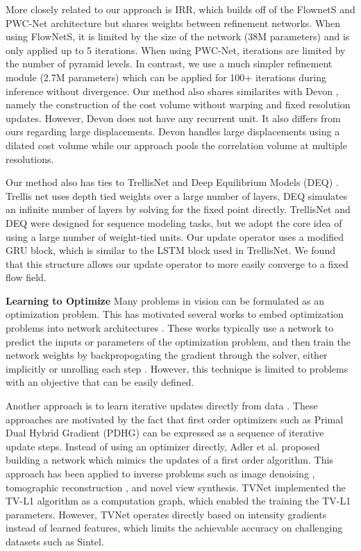\documentclass[runningheads]{llncs}
\begin{document}
More closely related to our approach is IRR\cite{irr}, which builds off of the FlownetS and PWC-Net architecture but shares weights between refinement networks.  When using FlowNetS, it is limited by the size of the network (38M parameters) and is only applied up to 5 iterations. When using PWC-Net, iterations are limited by the number of pyramid levels. In contrast, we use a much simpler refinement module (2.7M parameters) which can be applied for 100+ iterations during inference without divergence. Our method also shares similarites with Devon \cite{devon}, namely the construction of the cost volume without warping and fixed resolution updates. However, Devon does not have any recurrent unit. It also differs from ours regarding large displacements. Devon handles large displacements using a dilated cost volume while our approach pools the correlation volume at multiple resolutions.

Our method also has ties to TrellisNet \cite{trellis} and Deep Equilibrium Models (DEQ) \cite{deq}. Trellis net uses depth tied weights over a large number of layers, DEQ simulates an infinite number of layers by solving for the fixed point directly. TrellisNet and DEQ were designed for sequence modeling tasks, but we adopt the core idea of using a large number of weight-tied units. Our update operator uses a modified GRU block\cite{cho2014properties}, which is similar to the LSTM block used in TrellisNet. We found that this structure allows our update operator to more easily converge to a fixed flow field.

\smallskip\noindent\textbf{Learning to Optimize}
Many problems in vision can be formulated as an optimization problem. This has motivated several works to embed optimization problems into network architectures \cite{optnet,diffcvx,banet,invcomp,deepv2d}. These works typically use a network to predict the inputs or parameters of the optimization problem, and then train the network weights by backpropogating the gradient through the solver, either implicitly\cite{optnet,diffcvx} or unrolling each step \cite{invcomp,banet}. However, this technique is limited to problems with an objective that can be easily defined.

Another approach is to learn iterative updates directly from data \cite{adler2017solving,adler2018learned}. These approaches are motivated by the fact that first order optimizers such as Primal Dual Hybrid Gradient (PDHG)\cite{pdhg} can be expressed as a sequence of iterative update steps. Instead of using an optimizer directly, Adler et al. \cite{adler2017solving} proposed building a network which mimics the updates of a first order algorithm. This approach has been applied to inverse problems such as image denoising \cite{variationalnetworks}, tomographic reconstruction \cite{adler2018learned}, and novel view synthesis\cite{deepview}. TVNet \cite{tvnet} implemented the TV-L1 algorithm as a computation graph, which enabled the training the TV-L1 parameters. However, TVNet operates directly based on intensity gradients instead of learned features, which limits the achievable accuracy on challenging datasets such as Sintel. 
\end{document}

